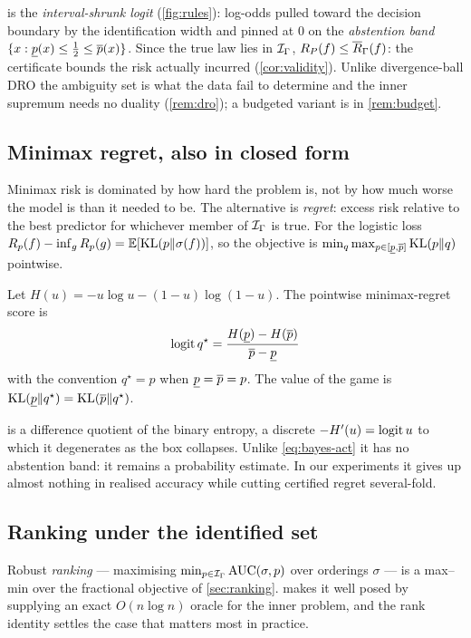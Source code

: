  is the \emph{interval-shrunk logit} (\cref{fig:rules}):
log-odds pulled toward the decision boundary by the identification width and
pinned at $0$ on the \emph{abstention band} $\{x:\underline{p}(x)\le\tfrac12\le\overline{p}(x)\}$.
Since the true law lies in $\mathcal{I}_\Gamma$, $R_P(f)\le\overline{R}_\Gamma(f)$: the
certificate bounds the risk actually incurred (\cref{cor:validity}). Unlike
divergence-ball DRO the ambiguity set is what the data fail to determine and
the inner supremum needs no duality (\cref{rem:dro}); a budgeted variant is
in \cref{rem:budget}.

\subsection{Minimax regret, also in closed form}

Minimax risk is dominated by how hard the problem is, not by how much worse
the model is than it needed to be. The alternative is \emph{regret}: excess
risk relative to the best predictor for whichever member of $\mathcal{I}_\Gamma$ is
true. For the logistic loss $R_p(f)-\inf_g R_p(g)=\mathbb{E}[\operatorname{KL}(p\|\sigma(f))]$, so
the objective is $\min_q\max_{p\in[\underline{p},\overline{p}]}\operatorname{KL}(p\|q)$ pointwise.

\begin{proposition}
\label{prop:regret}
Let $H(u) = -u\log u - (1-u)\log(1-u)$. The pointwise minimax-regret score is
\begin{equation}
  \operatorname{logit} q^\star
  =
  \frac{H(\underline{p}) - H(\overline{p})}{\overline{p}-\underline{p}}
  \label{eq:regret-rule}
\end{equation}
with the convention $q^\star = p$ when $\underline{p}=\overline{p}=p$. The value of the game is
$\operatorname{KL}(\underline{p}\|q^\star) = \operatorname{KL}(\overline{p}\|q^\star)$.
\end{proposition}

 is a difference quotient of the binary entropy, a
discrete $-H'(u)=\operatorname{logit} u$ to which it degenerates as the box collapses.
Unlike \eqref{eq:bayes-act} it has no abstention band: it remains a
probability estimate. In our experiments it gives up almost nothing in
realised accuracy while cutting certified regret several-fold.

\subsection{Ranking under the identified set}
\label{sec:robust-ranking}

Robust \emph{ranking} --- maximising $\min_{p\in\mathcal{I}_\Gamma}\operatorname{AUC}(\sigma,p)$ over
orderings $\sigma$ --- is a max--min over the fractional objective of
\cref{sec:ranking}.  makes it well posed by supplying an
exact $O(n\log n)$ oracle for the inner problem, and the rank identity settles
the case that matters most in practice.

